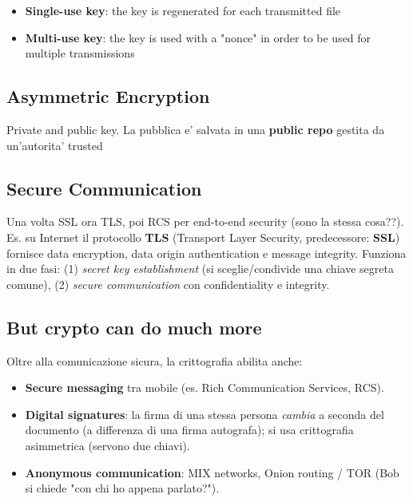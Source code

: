 \begin{itemize}
\item \textbf{Single-use key}: the key is regenerated for each transmitted file
\item \textbf{Multi-use key}: the key is used with a "nonce" in order to be used for multiple transmissions
\end{itemize}

\subsection{Asymmetric Encryption}
Private and public key. La pubblica e' salvata in una \textbf{public repo} gestita da un'autorita' trusted

\subsection{Secure Communication}

Una volta SSL ora TLS, poi RCS per end-to-end security (sono la stessa cosa??). Es. su Internet il protocollo \textbf{TLS} (Transport Layer Security, predecessore: \textbf{SSL}) fornisce data encryption, data origin authentication e message integrity. Funziona in due fasi: (1) \textit{secret key establishment} (si sceglie/condivide una chiave segreta comune), (2) \textit{secure communication} con confidentiality e integrity.

\subsection{But crypto can do much more}
Oltre alla comunicazione sicura, la crittografia abilita anche:
\begin{itemize}
  \item \textbf{Secure messaging} tra mobile (es. Rich Communication Services, RCS).
  \item \textbf{Digital signatures}: la firma di una stessa persona \textit{cambia} a seconda del documento (a differenza di una firma autografa); si usa crittografia asimmetrica (servono due chiavi).
  \item \textbf{Anonymous communication}: MIX networks, Onion routing / TOR (Bob si chiede "con chi ho appena parlato?").
\end{itemize}



